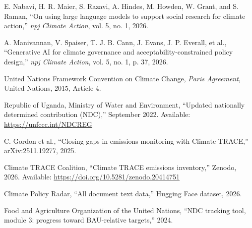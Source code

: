 \documentclass{article}
\begin{document}
\noindent [3] E. Nabavi, H. R. Maier, S. Razavi, A. Hindes, M. Howden, W. Grant, and S. Raman, ``On using large language models to support social research for climate action,'' {\it npj Climate Action}, vol. 5, no. 1, 2026.

\noindent [4] A. Manivannan, V. Spaiser, T. J. B. Cann, J. Evans, J. P. Everall, et al., ``Generative AI for climate governance and acceptability-constrained policy design,'' {\it npj Climate Action}, vol. 5, no. 1, p. 37, 2026.

\noindent [5] United Nations Framework Convention on Climate Change, {\it Paris Agreement}, United Nations, 2015, Article 4.

\noindent [6] Republic of Uganda, Ministry of Water and Environment, ``Updated nationally determined contribution (NDC),'' September 2022. Available: \url{https://unfccc.int/NDCREG}

\noindent [7] C. Gordon et al., ``Closing gaps in emissions monitoring with Climate TRACE,'' arXiv:2511.19277, 2025.

\noindent [8] Climate TRACE Coalition, ``Climate TRACE emissions inventory,'' Zenodo, 2026. Available: \url{https://doi.org/10.5281/zenodo.20414751}

\noindent [9] Climate Policy Radar, ``All document text data,'' Hugging Face dataset, 2026.

\noindent [10] Food and Agriculture Organization of the United Nations, ``NDC tracking tool, module 3: progress toward BAU-relative targets,'' 2024.
\end{document}
